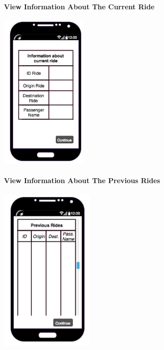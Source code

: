 		\paragraph{View Information About The Current Ride}
		\begin{center}
		    \includegraphics[width=0.32\textwidth]{./images/TELEFONO5}
		\end{center}
		\paragraph{View Information About The Previous Rides}
		\begin{center}
		    \includegraphics[width=0.35\textwidth]{./images/TELEFONO6}
		\end{center}
